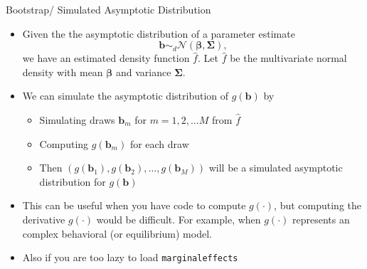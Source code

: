 \begin{frame}{Bootstrap/ Simulated Asymptotic Distribution}
\begin{itemize}
\item Given the the asymptotic distribution of a parameter estimate
\[
\boldsymbol{b}\sim_{d}\mathcal{N}\left(\boldsymbol{\beta},\boldsymbol{\Sigma}\right),
\]
we have an estimated density function $\hat{f}$. Let $\hat{f}$ be
the multivariate normal density with mean $\boldsymbol{\beta}$ and
variance $\boldsymbol{\Sigma}$.
\item We can simulate the asymptotic distribution of $g\left(\boldsymbol{b}\right)$
by
\begin{itemize}
\item Simulating draws $\boldsymbol{b}_{m}$ for $m=1,2,\dots M$ from $\hat{f}$
\item Computing $g\left(\boldsymbol{b}_{m}\right)$ for each draw
\item Then $\left(g\left(\boldsymbol{b}_{1}\right),g\left(\boldsymbol{b}_{2}\right),\dots,g\left(\boldsymbol{b}_{M}\right)\right)$
will be a simulated asymptotic distribution for $g\left(\boldsymbol{b}\right)$
\end{itemize}
\item This can be useful when you have code to compute $g\left(\cdot\right)$,
but computing the derivative $g\left(\cdot\right)$ would be difficult.
For example, when $g\left(\cdot\right)$ represents an complex behavioral
(or equilibrium) model.
\item Also if you are too lazy to load \texttt{marginaleffects}
\end{itemize}
\end{frame}



